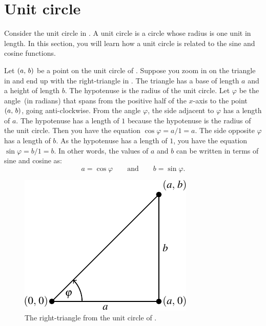 \documentclass[a4paper,oneside,12pt]{article}
\begin{document}

\section{Unit circle}

Consider the unit circle in .  A unit
circle is a circle whose radius is one unit in length.  In this
section, you will learn how a unit circle is related to the sine and
cosine functions.

Let $\left\lparen{a},\, {b}\right\rparen$ be a point on the unit circle of
.  Suppose you zoom in on the
triangle in  and end up with the
right-triangle in .  The
triangle has a base of length $a$ and a height of length $b$.  The
hypotenuse is the radius of the unit circle.  Let $\varphi$ be the
angle~(in radians) that spans from the positive half of the $x$-axis
to the point $\left\lparen{a},\, {b}\right\rparen$, going anti-clockwise.  From the angle
$\varphi$, the side adjacent to $\varphi$ has a length of $a$.  The
hypotenuse has a length of $1$ because the hypotenuse is the radius of
the unit circle.  Then you have the equation
$\cos\varphi = a / 1 = a$.  The side opposite $\varphi$ has a length
of $b$.  As the hypotenuse has a length of $1$, you have the equation
$\sin\varphi = b / 1 = b$.  In other words, the values of $a$ and $b$
can be written in terms of sine and cosine as:
\begin{equation}
\label{eqn:value_of_x_y_on_unit_circle}
a = \cos\varphi
\qquad\text{and}\qquad
b = \sin\varphi.
\end{equation}

\begin{figure}[!htbp]
\centering
\includegraphics[scale=1]{image/04/unit-circle-right-triangle.pdf}
\caption{%
  The right-triangle from the unit circle of
  .
}
\label{fig:right_triangle_in_unit_circle}
\end{figure}
\end{document}
